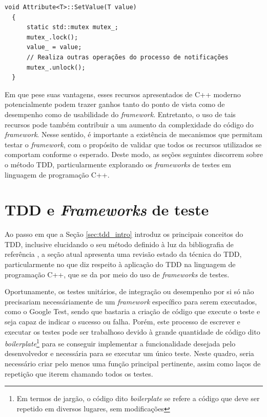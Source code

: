 \begin{lstlisting}[caption = {Uso de \textit{mutex} nos \textit{Attributes}},
  source = {Autoria própria}, float=htb,
  label = {cod:mutex_pon}]
  void Attribute<T>::SetValue(T value)
  {
      static std::mutex mutex_;
      mutex_.lock();
      value_ = value;
      // Realiza outras operações do processo de notificações
      mutex_.unlock();
  }
\end{lstlisting}

Em que pese suas vantagens, esses recursos apresentados de C++ moderno
potencialmente podem trazer ganhos tanto do ponto de vista como de desempenho
como de usabilidade do \textit{framework}. Entretanto, o uso de tais recursos
pode também contribuir a um aumento da complexidade do código do
\textit{framework}. Nesse sentido, é importante a existência de mecanismos que
permitam testar o \textit{framework}, com o propósito de validar que todos os
recursos utilizados se comportam conforme o esperado. Deste modo, as seções
seguintes discorrem sobre o método TDD, particularmente explorando os
\textit{frameworks} de testes em linguagem de programação C++.

\section{TDD e \textit{Frameworks} de teste}\label{sec:test_frameworks}

Ao passo em que a Seção \ref{sec:tdd_intro} introduz os principais conceitos do
TDD, inclusive elucidando o seu método definido à luz da bibliografia de
referência \cite{ambler_2006}, a seção atual apresenta uma revisão estado da
técnica do TDD, particularmente no que diz respeito à aplicação do TDD na
linguagem de programação C++, que se da por meio do uso de \textit{frameworks}
de testes.

Oportunamente, os testes unitários, de integração ou desempenho por si só não
precisariam necessáriamente de um \textit{framework} específico para serem
executados, como o Google Test, sendo que bastaria a criação de código que
execute o teste e seja capaz de indicar o sucesso ou falha. Porém, este processo
de escrever e executar os testes pode ser trabalhoso devido à grande quantidade
de código dito \textit{boilerplate}\footnote{Em termos de jargão, o código dito
\textit{boilerplate} se refere a código que deve ser repetido em diversos
lugares, sem modificações} para se conseguir implementar a funcionalidade
desejada pelo desenvolvedor e necessária para se executar um único teste. Neste
quadro, seria necessário criar pelo menos uma função principal pertinente, assim
como laços de repetição que iterem chamando todos os testes.

